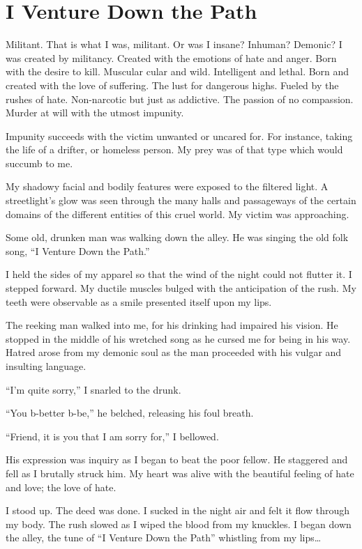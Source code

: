 \chapter{I Venture Down the Path}

Militant. That is what I was, militant. Or was I insane? Inhuman?
Demonic? I was created by militancy. Created with the emotions of hate
and anger. Born with the desire to kill. Muscular cular and
wild. Intelligent and lethal. Born and created with the love of
suffering. The lust for dangerous highs. Fueled by the rushes of
hate. Non-narcotic but just as addictive. The passion of no
compassion. Murder at will with the utmost impunity.

Impunity succeeds with the victim unwanted or uncared for. For instance,
taking the life of a drifter, or homeless person. My prey was of that
type which would succumb to me.

My shadowy facial and bodily features were exposed to the filtered
light. A streetlight's glow was seen through the many halls and
passageways of the certain domains of the different entities of this
cruel world. My victim was approaching.

Some old, drunken man was walking down the alley. He was singing the old
folk song, ``I Venture Down the Path.''

I held the sides of my apparel so that the wind of the night could not
flutter it. I stepped forward. My ductile muscles bulged with the
anticipation of the rush. My teeth were observable as a smile presented
itself upon my lips.

The reeking man walked into me, for his drinking had impaired his
vision. He stopped in the middle of his wretched song as he cursed me
for being in his way. Hatred arose from my demonic soul as the man
proceeded with his vulgar and insulting language.

``I'm quite sorry,'' I snarled to the drunk.

``You b-better b-be,'' he belched, releasing his foul breath.

``Friend, it is you that I am sorry for,'' I bellowed.

His expression was inquiry as I began to beat the poor fellow. He
staggered and fell as I brutally struck him. My heart was alive with the
beautiful feeling of hate and love; the love of hate.

I stood up. The deed was done. I sucked in the night air and felt it
flow through my body. The rush slowed as I wiped the blood from my
knuckles. I began down the alley, the tune of ``I Venture Down the Path''
whistling from my lips\ldots
